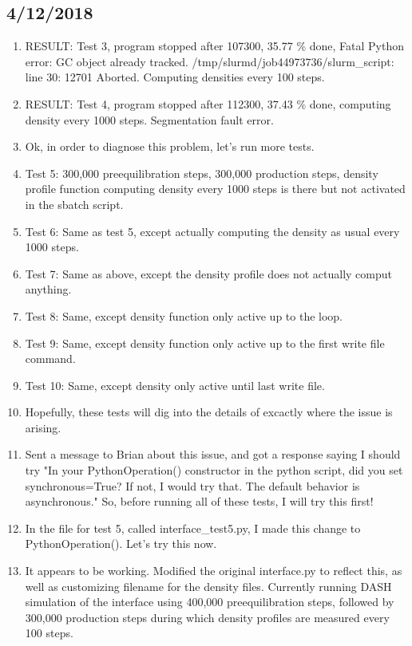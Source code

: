 \documentclass[12pt,reqno]{amsart}
\numberwithin{equation}{section}
\begin{document}
\subsection{4/12/2018}
\begin{enumerate}
\item RESULT: Test 3, program stopped after 107300, 35.77 \% done, Fatal Python error: GC object already tracked.  /tmp/slurmd/job44973736/slurm\_script: line 30: 12701 Aborted.  Computing densities every 100 steps.  
\item RESULT: Test 4, program stopped after 112300, 37.43 \% done, computing density every 1000 steps.  Segmentation fault error.  
\item Ok, in order to diagnose this problem, let's run more tests.  

\item Test 5: 300,000 preequilibration steps, 300,000 production steps, density profile function computing density every 1000 steps is there but not activated in the sbatch script.
\item Test 6: Same as test 5, except actually computing the density as usual every 1000 steps.
\item Test 7: Same as above, except the density profile does not actually comput anything.
\item Test 8: Same, except density function only active up to the loop.
\item Test 9: Same, except density function only active up to the first write file command.  
\item Test 10: Same, except density only active until last write file.
\item Hopefully, these tests will dig into the details of excactly where the issue is arising.  
\item Sent a message to Brian about this issue, and got a response saying I should try "In your PythonOperation() constructor in the python script, did you set synchronous=True?  If not, I would try that.  The default behavior is asynchronous."  So, before running all of these tests, I will try this first!
\item In the file for test 5, called interface\_test5.py, I made this change to PythonOperation().  Let's try this now. 
\item It appears to be working.  Modified the original interface.py to reflect this, as well as customizing filename for the density files.  Currently running DASH simulation of the interface using 400,000 preequilibration steps, followed by 300,000 production steps during which density profiles are measured every 100 steps.   
\end{enumerate}
\end{document}
